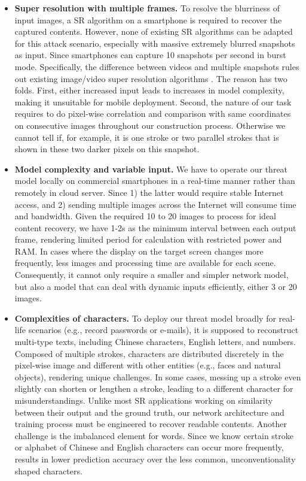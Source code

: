 \begin{itemize}[leftmargin=*]
  \item \textbf{Super resolution with multiple frames.} To resolve the blurriness of input images, a SR algorithm on a smartphone is required to recover the captured contents. However, none of existing SR algorithms can be adapted for this attack scenario, especially with massive extremely blurred snapshots as input. Since smartphones can capture 10 snapshots per second in burst mode. Specifically, the difference between videos and multiple snapshots rules out existing image/video super resolution algorithms\cite{lucas2019generative} \cite{kappeler2016video}. The reason has two folds. First, either increased input leads to increases in model complexity, making it unsuitable for mobile deployment. Second, the nature of our task requires to do pixel-wise correlation and comparison with same coordinates on consecutive images throughout our construction process. Otherwise we cannot tell if, for example, it is one stroke or two parallel strokes that is shown in these two darker pixels on this snapshot.
  \item \textbf{Model complexity and variable input.} We have to operate our threat model locally on commercial smartphones in a real-time manner rather than remotely in cloud server. Since 1) the latter would require stable Internet access, and 2) sending multiple images across the Internet will consume time and bandwidth. Given the required 10 to 20 images to process for ideal content recovery, we have 1-2s as the minimum interval between each output frame, rendering limited period for calculation with restricted power and RAM. In cases where the display on the target screen changes more frequently, less images and processing time are available for each scene. Consequently, it cannot only require a smaller and simpler network model, but also a model that can deal with dynamic inputs efficiently, either 3 or 20 images.
  \item \textbf{Complexities of characters.} To deploy our threat model broadly for real-life scenarios (e.g., record passwords or e-mails), it is supposed to reconstruct multi-type texts, including Chinese characters, English letters, and numbers. Composed of multiple strokes, characters are distributed discretely in the pixel-wise image and different with other entities (e.g., faces and natural objects), rendering unique challenges. In some cases, messing up a stroke even slightly can shorten or lengthen a stroke, leading to a different character for misunderstandings. Unlike most SR applications working on similarity between their output and the ground truth, our network architecture and training process must be engineered to recover readable contents. Another challenge is the imbalanced element for words. Since we know certain stroke or alphabet of Chinese and English characters can occur more frequently, results in lower prediction accuracy over the less common, unconventionality shaped characters.

\end{itemize}
